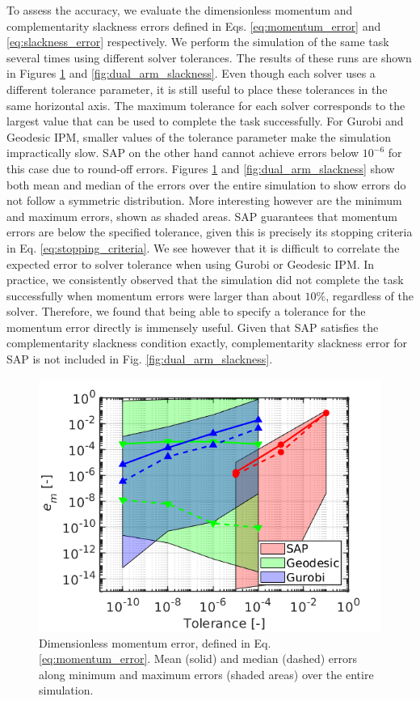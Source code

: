 To assess the accuracy, we evaluate the dimensionless momentum and
complementarity slackness errors defined in Eqs. \eqref{eq:momentum_error} and
\eqref{eq:slackness_error} respectively. We perform the simulation of the same
task several times using different solver tolerances. The results of these runs
are shown in Figures \ref{fig:dual_arm_momentum} and
\ref{fig:dual_arm_slackness}. Even though each solver uses a different tolerance
parameter, it is still useful to place these tolerances in the same horizontal
axis. The maximum tolerance for each solver corresponds to the largest value
that can be used to complete the task successfully. For Gurobi and Geodesic IPM,
smaller values of the tolerance parameter make the simulation impractically
slow. SAP on the other hand cannot achieve errors below $10^{-6}$ for this case
due to round-off errors. Figures \ref{fig:dual_arm_momentum} and
\ref{fig:dual_arm_slackness} show both mean and median of the errors over the
entire simulation to show errors do not follow a symmetric distribution. More
interesting however are the minimum and maximum errors, shown as shaded areas.
SAP guarantees that momentum errors are below the specified tolerance, given
this is precisely its stopping criteria in Eq. \eqref{eq:stopping_criteria}. We
see however that it is difficult to correlate the expected error to solver
tolerance when using Gurobi or Geodesic IPM. In practice, we consistently
observed that the simulation did not complete the task successfully when
momentum errors were larger than about $10\%$, regardless of the solver.
Therefore, we found that being able to specify a tolerance for the momentum
error directly is immensely useful. Given that SAP satisfies the complementarity
slackness condition exactly, complementarity slackness error for SAP is not
included in Fig. \ref{fig:dual_arm_slackness}.

\begin{figure}[!h]
	\centering
    \includegraphics[width=0.7\columnwidth]{figures/dual_arm/momentum_error.png}
    \caption{\label{fig:dual_arm_momentum} Dimensionless momentum error, defined
    in Eq. \eqref{eq:momentum_error}. Mean (solid) and median (dashed) errors
    along minimum and maximum errors (shaded areas) over the entire simulation.}
\end{figure}

